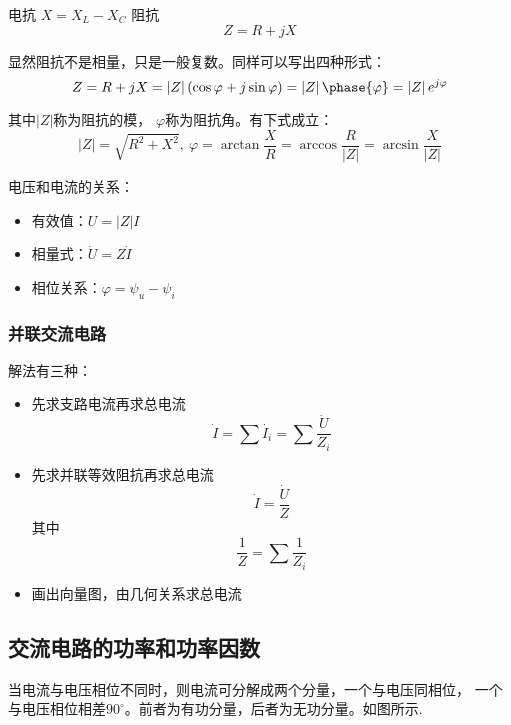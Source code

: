 电抗 $X=X_L-X_C$
阻抗 
\[
    Z=R+jX
\]

显然阻抗不是相量，只是一般复数。同样可以写出四种形式：
\[
    Z=R+jX= \left\lvert Z \right\rvert (\cos \varphi + j\sin \varphi ) = \left\lvert Z \right\rvert \phase{\varphi} = \left\lvert Z \right\rvert e^{j\varphi}
\]

其中$\left\lvert Z \right\rvert$称为阻抗的模，
$\varphi$称为阻抗角。有下式成立：
\[
    \left\lvert Z \right\rvert = \sqrt{R^2+X^2},~ \varphi = \arctan \frac{X}{R} = \arccos \frac{R}{\left\lvert Z \right\rvert} = \arcsin \frac{X}{\left\lvert Z \right\rvert}
\]

电压和电流的关系：

\begin{itemize}
    \item 有效值：$U=\left\lvert Z \right\rvert I$
    \item 相量式：$\dot{U}=Z\dot{I}$
    \item 相位关系：$\varphi = \psi _u - \psi _i $
\end{itemize}

\subsubsection{并联交流电路}

解法有三种：
\begin{itemize}
    \item 先求支路电流再求总电流
     \[\dot{I}=\sum \dot{I_i}=\sum \frac{\dot{U}}{Z_i}\]
    \item 先求并联等效阻抗再求总电流 
    \[\dot{I}=\frac{\dot{U}}{Z} \]
    其中 
    \[\frac{1}{Z}=\sum \frac{1}{Z_i}\]
    \item 画出向量图，由几何关系求总电流
\end{itemize}


\subsection{交流电路的功率和功率因数}


\begin{wrapfigure}{right}{65mm}
    \centering
\end{wrapfigure}
当电流与电压相位不同时，则电流可分解成两个分量，一个与电压同相位，
一个与电压相位相差$90^\circ$。前者为有功分量，后者为无功分量。如图所示.


